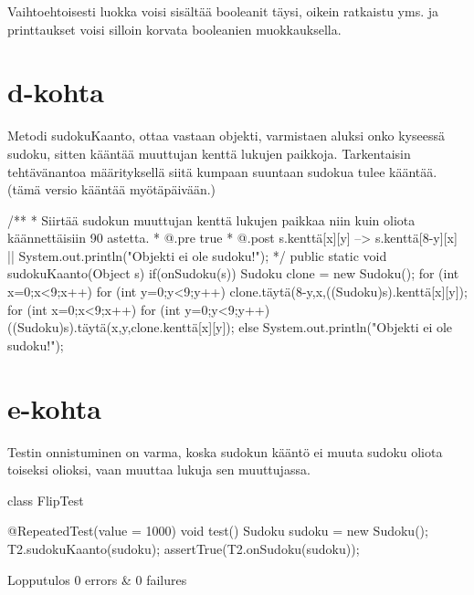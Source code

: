 Vaihtoehtoisesti luokka voisi sisältää booleanit täysi, oikein ratkaistu yms. ja printtaukset voisi silloin
korvata booleanien muokkauksella.

\section{d-kohta}
\label{d-kohta}

Metodi sudokuKaanto, ottaa vastaan objekti, varmistaen aluksi onko kyseessä sudoku, sitten kääntää muuttujan kenttä
lukujen paikkoja. Tarkentaisin tehtävänantoa määrityksellä siitä kumpaan suuntaan sudokua tulee kääntää.
(tämä versio kääntää myötäpäivään.)
\begin{javacode}
  /**
   * Siirtää sudokun muuttujan kenttä lukujen paikkaa niin kuin oliota käännettäisiin 90 astetta.
   * @.pre true
   * @.post s.kenttä[x][y] --> s.kenttä[8-y][x] || System.out.println("Objekti ei ole sudoku!");
   */
  public static void sudokuKaanto(Object s){
    if(onSudoku(s)) {
      Sudoku clone = new Sudoku();
      for (int x=0;x<9;x++) {
        for (int y=0;y<9;y++) {
          clone.täytä(8-y,x,((Sudoku)s).kenttä[x][y]);
        }
      }
      for (int x=0;x<9;x++) {
        for (int y=0;y<9;y++) {
          ((Sudoku)s).täytä(x,y,clone.kenttä[x][y]);
        }
      }
    }else {
      System.out.println("Objekti ei ole sudoku!");
    }
  }
\end{javacode}

\section{e-kohta}
\label{e-kohta}

Testin onnistuminen on varma, koska sudokun kääntö ei muuta sudoku oliota toiseksi olioksi, vaan muuttaa lukuja sen
muuttujassa.

\begin{javacode}
class FlipTest {

  @RepeatedTest(value = 1000)
  void test() {
    Sudoku sudoku = new Sudoku();
    T2.sudokuKaanto(sudoku);
    assertTrue(T2.onSudoku(sudoku));
  }

}
\end{javacode}
Lopputulos 0 errors & 0 failures